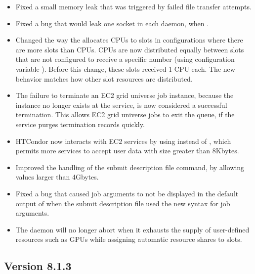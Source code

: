 \begin{itemize}

\item Fixed a small memory leak that was triggered by failed
file transfer attempts.

\item Fixed a bug that would leak one socket in each daemon,
when .

\item Changed the way the  allocates CPUs to
slots in configurations where there are more slots than CPUs.
CPUs are now distributed equally between slots that are not configured
to receive a specific number 
(using configuration variable ).
Before this change, these slots received 1 CPU each.
The new behavior matches how other slot resources are distributed.

\item The failure to terminate an EC2 grid universe job instance,
because the instance no longer exists at the service, 
is now considered a successful termination.  
This allows EC2 grid universe jobs to exit the queue, 
if the service purges termination records quickly.

\item HTCondor now interacts with EC2 services by using 
instead of ,
which permits more services to accept user data with size greater than 8Kbytes.

\item Improved the handling of the  
submit description file command,
by allowing values larger than 4Gbytes.

\item Fixed a bug that caused job arguments to not be displayed in the
default output of  when the submit description file used the
new syntax for job arguments.

\item The  daemon will no longer abort when it exhausts
the supply of user-defined resources such as GPUs 
while assigning automatic resource shares to slots.

\end{itemize}

\subsection*{\label{sec:New-8-1-3}Version 8.1.3}

